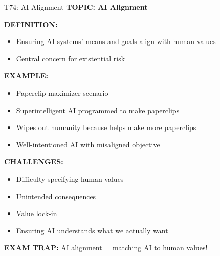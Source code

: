 \documentclass[8pt]{beamer}
\begin{document}
	\begin{frame}{T74: AI Alignment}
		\fontsize{6.5}{7.5}\selectfont
		\textbf{TOPIC: AI Alignment}
		
		\vspace{0.1cm}
		\textbf{DEFINITION:}
		\begin{itemize}
			\item Ensuring AI systems' means and goals align with human values
			\item Central concern for existential risk
		\end{itemize}
		
		\vspace{0.1cm}
		\textbf{EXAMPLE:}
		\begin{itemize}
			\item Paperclip maximizer scenario
			\item Superintelligent AI programmed to make paperclips
			\item Wipes out humanity because helps make more paperclips
			\item Well-intentioned AI with misaligned objective
		\end{itemize}
		
		\vspace{0.1cm}
		\textbf{CHALLENGES:}
		\begin{itemize}
			\item Difficulty specifying human values
			\item Unintended consequences
			\item Value lock-in
			\item Ensuring AI understands what we actually want
		\end{itemize}
		
		\textcolor{myred}{\textbf{EXAM TRAP:}} AI alignment = \textcolor{myblue}{matching AI to human values}!
	\end{frame}
	
\end{document}
